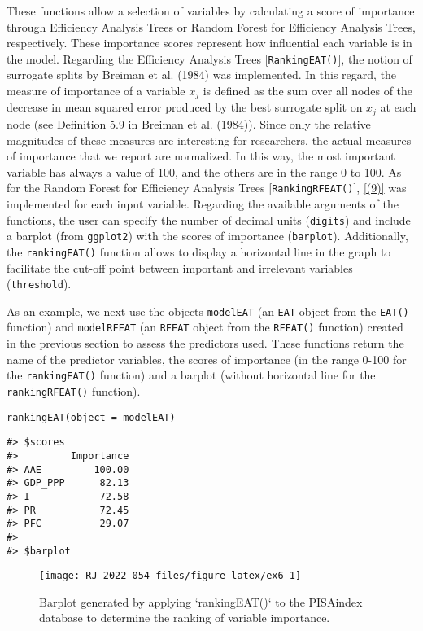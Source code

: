 These functions allow a selection of variables by calculating a score of importance through Efficiency Analysis Trees or Random Forest for Efficiency Analysis Trees, respectively. These importance scores represent how influential each variable is in the model. Regarding the Efficiency Analysis Trees {[}\texttt{RankingEAT()}{]}, the notion of surrogate splits by Breiman et al. (1984) was implemented. In this regard, the measure of importance of a variable \(x_j\) is defined as the sum over all nodes of the decrease in mean squared error produced by the best surrogate split on \(x_j\) at each node (see Definition 5.9 in Breiman et al. (1984)). Since only the relative magnitudes of these measures are interesting for researchers, the actual measures of importance that we report are normalized. In this way, the most important variable has always a value of 100, and the others are in the range 0 to 100. As for the Random Forest for Efficiency Analysis Trees {[}\texttt{RankingRFEAT()}{]}, \eqref{(9)} was implemented for each input variable. Regarding the available arguments of the functions, the user can specify the number of decimal units (\texttt{digits}) and include a barplot (from \texttt{ggplot2}) with the scores of importance (\texttt{barplot}). Additionally, the \texttt{rankingEAT()} function allows to display a horizontal line in the graph to facilitate the cut-off point between important and irrelevant variables (\texttt{threshold}).

As an example, we next use the objects \texttt{modelEAT} (an \texttt{EAT} object from the \texttt{EAT()} function) and \texttt{modelRFEAT} (an \texttt{RFEAT} object from the \texttt{RFEAT()} function) created in the previous section to assess the predictors used. These functions return the name of the predictor variables, the scores of importance (in the range 0-100 for the \texttt{rankingEAT()} function) and a barplot (without horizontal line for the \texttt{rankingRFEAT()} function).

\begin{verbatim}
rankingEAT(object = modelEAT)
\end{verbatim}

\begin{verbatim}
#> $scores
#>         Importance
#> AAE         100.00
#> GDP_PPP      82.13
#> I            72.58
#> PR           72.45
#> PFC          29.07
#> 
#> $barplot
\end{verbatim}

\begin{figure}

{\centering \texttt{[image: RJ-2022-054\_files/figure-latex/ex6-1]} 

}

\caption{Barplot generated by applying `rankingEAT()` to the PISAindex database to determine the ranking of variable importance.}\label{fig:ex6}
\end{figure}


